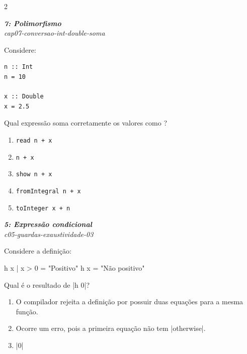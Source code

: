 \documentclass[a4paper,10pt,brazil]{article}
\begin{document}
\begin{multicols}{2}
\begin{enumerate}
\end{enumerate}

\begin{flushright}
  \footnotesize
  \textit{\textbf{7: Polimorfismo}}\\
  \textit{cap07-conversao-int-double-soma}\\

\end{flushright}
Considere:

\begin{verbatim}
n :: Int
n = 10

x :: Double
x = 2.5
\end{verbatim}

Qual expressão soma corretamente os valores como ?

\begin{enumerate}
  \item \texttt{read n + x}
  \item \texttt{n + x}
  \item \texttt{show n + x}
  \item \texttt{fromIntegral n + x}
  \item \texttt{toInteger x + n}

\end{enumerate}

\begin{flushright}
  \footnotesize
  \textit{\textbf{5: Expressão condicional}}\\
  \textit{c05-guardas-exaustividade-03}\\

\end{flushright}
Considere a definição:
\begin{haskellcode}
h x
  | x > 0 = "Positivo"
h x = "Não positivo"
\end{haskellcode}
Qual é o resultado de \haskellinline|h 0|?

\begin{enumerate}
  \item O compilador rejeita a definição por possuir duas equações para a mesma função.

  \item Ocorre um erro, pois a primeira equação não tem \haskellinline|otherwise|.

  \item \haskellinline|0|


\end{enumerate}
\end{multicols}
\end{document}

